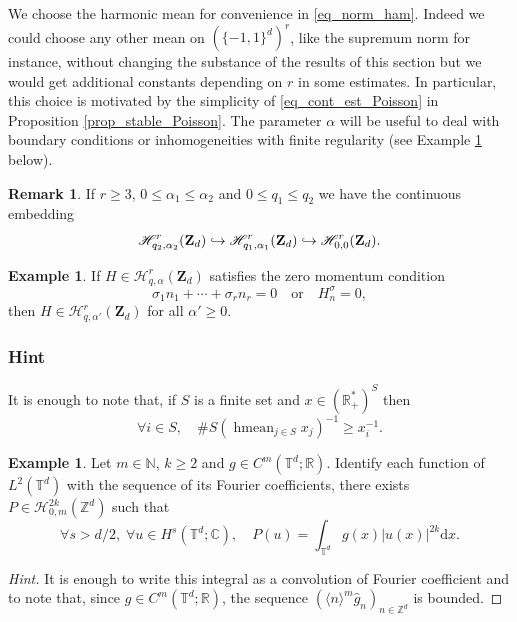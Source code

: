 \documentclass[11pt]{article}
\providecommand{\skipqed}{\renewcommand{\qedsymbol}{}}
\newcommand\hto{\mathrel{\lhook\joinrel\to}}
\theoremstyle{definition}
\newtheorem{remark}[theorem]{Remark}
\newtheorem{example}[theorem]{Example}
\begin{document}
We choose the harmonic mean for convenience in \eqref{eq_norm_ham}. Indeed we could choose any other mean on $(\{-1,1\}^d)^r$, like the supremum norm for instance, without changing the substance of the results of this section but we would get additional constants depending on $r$ in some estimates. In particular, this choice is motivated by the simplicity of \eqref{eq_cont_est_Poisson} in Proposition \ref{prop_stable_Poisson}. The parameter $\alpha$ will be useful to deal with boundary conditions or inhomogeneities with finite regularity (see Example \ref{example:m} below).

\begin{remark} If $r\geq 3$, $0\leq \alpha_1 \leq \alpha_2 $ and $0\leq q_1 \leq q_2 $ we have the continuous embedding\vspace*{-3pt}
\[
\mathscr{H}_{q_2,\alpha_2}^{r}(\mathbf{Z}_d) \hto \mathscr{H}_{q_1,\alpha_1}^{r}(\mathbf{Z}_d) \hto \mathscr{H}_{0,0}^{r}(\mathbf{Z}_d).
\]
\end{remark}

\begin{example} If $H\in \mathscr{H}_{q,\alpha}^{r}(\mathbf{Z}_d)$ satisfies the zero momentum condition
\[
\sigma_1 n_1+ \cdots+ \sigma_r n_r = 0 \quad \mathrm{or} \quad H_{n}^{\sigma}=0,
\]
then $H\in \mathscr{H}_{q,\alpha'}^{r}(\mathbf{Z}_d)$ for all $\alpha'\geq 0$.
\subsubsection*{Hint}
It is enough to note that, if $S$ is a finite set and $x\in (\mathbb{R}_+^*)^S$ then
\[
\forall i\in S, \quad \# S (\mathop{\mathrm{hmean}}_{j\in S} x_j)^{-1} \geq x_{i}^{-1}.
\]
\end{example}

\begin{example}\label{example:m} Let $m\in \mathbb{N}$, $k\geq 2$ and $g\in C^m(\mathbb{T}^d;\mathbb{R})$. Identify each function of $L^2(\mathbb{T}^d)$ with the sequence of its Fourier coefficients, there exists $P\in \mathscr{H}_{0,m}^{2k}(\mathbb{Z}^d)$ such that
\[
\forall s>d/2,\;\forall u\in H^s(\mathbb{T}^d;\mathbb{C}), \quad P(u) = \int_{\mathbb{T}^d} g(x) |u(x)|^{2k} \mathrm{d}x.
\]
\begin{proof}[Hint]
It is enough to write this integral as a convolution of Fourier coefficient and to note that, since $g\in C^m(\mathbb{T}^d;\mathbb{R})$, the sequence $(\langle n\rangle^m \widehat{g}_n)_{n\in \mathbb{Z}^d}$ is bounded.\skipqed
\end{proof}
\end{example}
\end{document}
